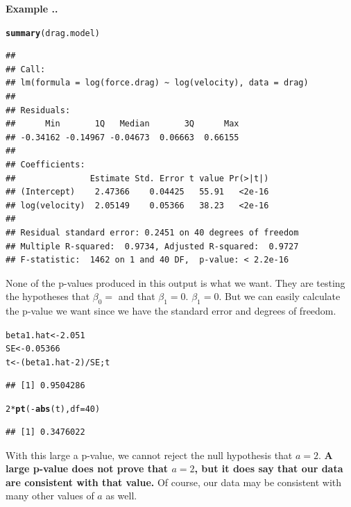 \documentclass[twoside]{book}\usepackage[]{graphicx}\usepackage[]{xcolor}
\makeatletter
\newcommand{\hlnum}[1]{\textcolor[rgb]{0.686,0.059,0.569}{#1}}%
\newcommand{\hlopt}[1]{\textcolor[rgb]{0,0,0}{#1}}%
\newcommand{\hlstd}[1]{\textcolor[rgb]{0.345,0.345,0.345}{#1}}%
\newcommand{\hlkwb}[1]{\textcolor[rgb]{0.69,0.353,0.396}{#1}}%
\newcommand{\hlkwc}[1]{\textcolor[rgb]{0.333,0.667,0.333}{#1}}%
\newcommand{\hlkwd}[1]{\textcolor[rgb]{0.737,0.353,0.396}{\textbf{#1}}}%
\newenvironment{kframe}{%
 \def\at@end@of@kframe{}%
 \ifinner\ifhmode%
  \def\at@end@of@kframe{\end{minipage}}%
  \begin{minipage}{\columnwidth}%
 \fi\fi%
 \def\FrameCommand##1{\hskip\@totalleftmargin \hskip-\fboxsep
 \colorbox{shadecolor}{##1}\hskip-\fboxsep
     \hskip-\linewidth \hskip-\@totalleftmargin \hskip\columnwidth}%
 \MakeFramed {\advance\hsize-\width
   \@totalleftmargin\z@ \linewidth\hsize
   \@setminipage}}%
 {\par\unskip\endMakeFramed%
 \at@end@of@kframe}
\newenvironment{knitrout}{}{} %
\newcounter{example}[section]
\newenvironment{example}%
{\refstepcounter{example}%
\textbf{Example \thesection.\arabic{example}. }}%
{}
\makeatother
\begin{document}
\begin{example}
\begin{knitrout}
{}



\end{knitrout}

\begin{knitrout}
\color{fgcolor}\begin{kframe}
\begin{alltt}
\hlkwd{summary}\hlstd{(drag.model)}
\end{alltt}
\begin{verbatim}
## 
## Call:
## lm(formula = log(force.drag) ~ log(velocity), data = drag)
## 
## Residuals:
##      Min       1Q   Median       3Q      Max 
## -0.34162 -0.14967 -0.04673  0.06663  0.66155 
## 
## Coefficients:
##               Estimate Std. Error t value Pr(>|t|)
## (Intercept)    2.47366    0.04425   55.91   <2e-16
## log(velocity)  2.05149    0.05366   38.23   <2e-16
## 
## Residual standard error: 0.2451 on 40 degrees of freedom
## Multiple R-squared:  0.9734,	Adjusted R-squared:  0.9727 
## F-statistic:  1462 on 1 and 40 DF,  p-value: < 2.2e-16
\end{verbatim}
\end{kframe}
\end{knitrout}
None of the p-values produced in this output is what we want.  
They are testing the hypotheses that $\beta_0=$ and that $\beta_1 = 0$.
$\beta_1 = 0$.  
But we can easily calculate the p-value we want since we have the standard error
and degrees of freedom.
\begin{knitrout}
\color{fgcolor}\begin{kframe}
\begin{alltt}
\hlstd{beta1.hat} \hlkwb{<-} \hlnum{2.051}
\hlstd{SE} \hlkwb{<-} \hlnum{0.05366}
\hlstd{t} \hlkwb{<-}  \hlstd{( beta1.hat} \hlopt{-} \hlnum{2} \hlstd{)} \hlopt{/} \hlstd{SE; t}
\end{alltt}
\begin{verbatim}
## [1] 0.9504286
\end{verbatim}
\begin{alltt}
\hlnum{2} \hlopt{*} \hlkwd{pt}\hlstd{(} \hlopt{-} \hlkwd{abs}\hlstd{(t),} \hlkwc{df}\hlstd{=} \hlnum{40} \hlstd{)}
\end{alltt}
\begin{verbatim}
## [1] 0.3476022
\end{verbatim}
\end{kframe}
\end{knitrout}
With this large a p-value, we cannot reject the null hypothesis that $a=2$.
\textbf{A large p-value does not prove that $a=2$, 
but it does say that our data are consistent with that value.}  
Of course, our data may be consistent with many other values of $a$ as well.
\end{example}
\end{document}

